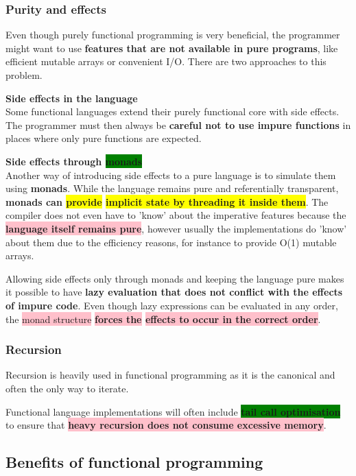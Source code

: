 \documentclass[tikz,border=10pt]{project_plan}
\begin{document}
\subsubsection{Purity and effects}

Even though purely functional programming is very beneficial, the programmer
might want to use \textbf{features that are not available in pure programs},
like efficient mutable arrays or convenient I/O. There are two approaches to this problem.

\textbf{Side effects in the language}\\
Some functional languages extend their purely functional core with side effects.
The programmer must then always be \textbf{careful not to use impure functions} in places
where only pure functions are expected.


\textbf{Side effects through \colorbox{green}{monads}}\\
Another way of introducing side effects to a pure language is to simulate them
using \textbf{monads}. While the language remains pure and referentially
transparent, \textbf{monads can \colorbox{yellow}{provide} \colorbox{yellow}{implicit state by threading it inside them}}.
The compiler does not even have to 'know' about the imperative features because
the \colorbox{pink}{\textbf{language itself remains pure}}, however usually the implementations
do 'know' about them due to the efficiency reasons, for instance
to provide O(1) mutable arrays.

Allowing side effects only through monads and keeping the language pure makes
it possible to have \textbf{lazy evaluation that does not conflict with the effects of impure code}.
Even though lazy expressions can be evaluated in any order, the \colorbox{pink}{monad structure}
\textbf{\colorbox{pink}{forces the} \colorbox{pink}{effects to occur in the correct order}}.

\subsubsection{Recursion}

Recursion is heavily used in functional programming as it is the canonical
and often the only way to iterate.

Functional language implementations will often include \colorbox{green}{\textbf{tail call optimisation}}
to ensure that \colorbox{pink}{\textbf{heavy recursion does not consume excessive memory}}.

\subsection{Benefits of functional programming}
\end{document}
